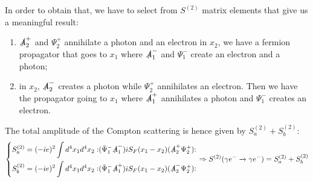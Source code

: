 \documentclass[../main.tex]{subfiles}
\begin{document}

In order to obtain that, we have to select from $S^{(2)}$ matrix elements that give us a meaningful result:
\begin{enumerate}[label=\alph*)]
    \item $\slashed{A}^+_2$ and $\Psi^+_2$ annihilate a photon and an electron in $x_2$, we have a fermion propagator that goes to $x_1$ where $\slashed{A}^-_1$ and $\Psi^-_1$ create an electron and a photon;
    \item in $x_2$, $\slashed{A}^-_2$ creates a photon while $\Psi^+_2$ annihilates an electron. Then we have the propagator going to $x_1$ where $\slashed{A}^+_1$ annihilates a photon and $\Psi^-_1$ creates an electron.
\end{enumerate}
The total amplitude of the Compton scattering is hence given by $S^{(2)}_a+S^{(2)}_b$:
\[
\left\{
\begin{aligned}
S_a^{(2)}&=(-ie)^2\int d^4x_1d^4x_2\vcentcolon\mathrel{(\bar{\Psi}_1^-\slashed{A}_1^-)iS_F(x_1-x_2)(\slashed{A}_2^+\Psi_2^+)}\vcentcolon\\
S_b^{(2)}&=(-ie)^2\int d^4x_1d^4x_2\vcentcolon\mathrel{(\bar{\Psi}_1^-\slashed{A}_1^+)iS_F(x_1-x_2)(\slashed{A}_2^-\Psi_2^+)}\vcentcolon
\end{aligned}
\right.
\Rightarrow S^{(2)}(\gamma e^-\xrightarrow[]{}\gamma e^-)=S_a^{(2)}+S_b^{(2)}
\]
\end{document}
